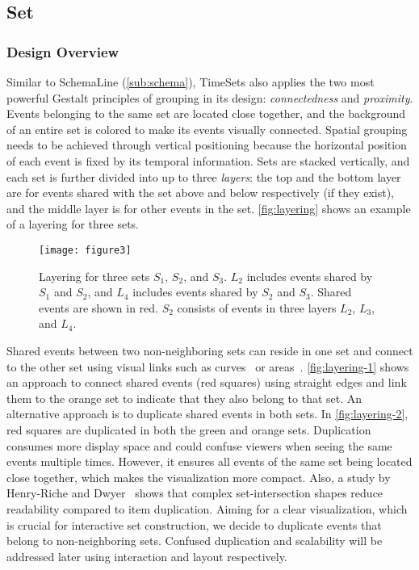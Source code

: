 \subsection{Set}
\subsubsection{Design Overview}
Similar to SchemaLine (\autoref{sub:schema}), TimeSets also applies the two most powerful Gestalt principles of grouping in its design: \emph{connectedness} and \emph{proximity}. Events belonging to the same set are located close together, and the background of an entire set is colored to make its events visually connected. Spatial grouping needs to be achieved through vertical positioning because the horizontal position of each event is fixed by its temporal information. Sets are stacked vertically, and each set is further divided into up to three \emph{layers}: the top and the bottom layer are for events shared with the set above and below respectively (if they exist), and the middle layer is for other events in the set. \autoref{fig:layering} shows an example of a layering for three sets.

\begin{figure}
\centering
\texttt{[image: figure3]}
\caption[Layering for three sets]{Layering for three sets $S_1$, $S_2$, and $S_3$. $L_2$ includes events shared by $S_1$ and $S_2$, and $L_4$ includes events shared by $S_2$ and $S_3$. Shared events are shown in red. $S_2$ consists of events in three layers $L_2$, $L_3$, and $L_4$.}
\label{fig:layering}
\end{figure}

Shared events between two non-neighboring sets can reside in one set and connect to the other set using visual links such as curves~\cite{Alper2011} or areas~\cite{Meulemans2013}. \autoref{fig:layering-1} shows an approach to connect shared events (red squares) using straight edges and link them to the orange set to indicate that they also belong to that set. An alternative approach is to duplicate shared events in both sets. In \autoref{fig:layering-2}, red squares are duplicated in both the green and orange sets. Duplication consumes more display space and could confuse viewers when seeing the same events multiple times. However, it ensures all events of the same set being located close together, which makes the visualization more compact. Also, a study by Henry-Riche and Dwyer~\cite{Riche2010} shows that complex set-intersection shapes reduce readability compared to item duplication. Aiming for a clear visualization, which is crucial for interactive set construction, we decide to duplicate events that belong to non-neighboring sets. Confused duplication and scalability will be addressed later using interaction and layout respectively.


